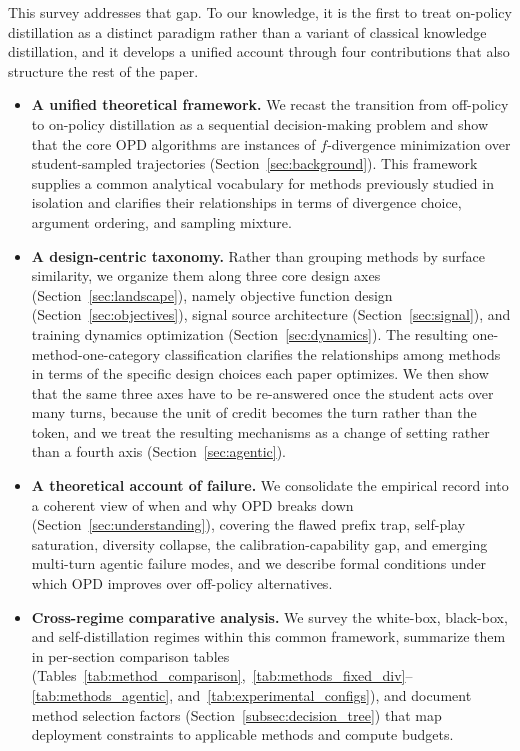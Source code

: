 \documentclass{article} %
\begin{document}
This survey addresses that gap. To our knowledge, it is the first to treat on-policy distillation as a distinct paradigm rather than a variant of classical knowledge distillation, and it develops a unified account through four contributions that also structure the rest of the paper.
\begin{itemize}[leftmargin=1.5em]
    \item \textbf{A unified theoretical framework.} We recast the transition from off-policy to on-policy distillation as a sequential decision-making problem and show that the core OPD algorithms are instances of $f$-divergence minimization over student-sampled trajectories (Section~\ref{sec:background}). This framework supplies a common analytical vocabulary for methods previously studied in isolation and clarifies their relationships in terms of divergence choice, argument ordering, and sampling mixture.
    \item \textbf{A design-centric taxonomy.} Rather than grouping methods by surface similarity, we organize them along three core design axes (Section~\ref{sec:landscape}), namely objective function design (Section~\ref{sec:objectives}), signal source architecture (Section~\ref{sec:signal}), and training dynamics optimization (Section~\ref{sec:dynamics}). The resulting one-method-one-category classification clarifies the relationships among methods in terms of the specific design choices each paper optimizes. We then show that the same three axes have to be re-answered once the student acts over many turns, because the unit of credit becomes the turn rather than the token, and we treat the resulting mechanisms as a change of setting rather than a fourth axis (Section~\ref{sec:agentic}).
    \item \textbf{A theoretical account of failure.} We consolidate the empirical record into a coherent view of when and why OPD breaks down (Section~\ref{sec:understanding}), covering the flawed prefix trap, self-play saturation, diversity collapse, the calibration-capability gap, and emerging multi-turn agentic failure modes, and we describe formal conditions under which OPD improves over off-policy alternatives.
    \item \textbf{Cross-regime comparative analysis.} We survey the white-box, black-box, and self-distillation regimes within this common framework, summarize them in per-section comparison tables (Tables~\ref{tab:method_comparison},~\ref{tab:methods_fixed_div}--\ref{tab:methods_agentic}, and~\ref{tab:experimental_configs}), and document method selection factors (Section~\ref{subsec:decision_tree}) that map deployment constraints to applicable methods and compute budgets.
\end{itemize}
\end{document}
